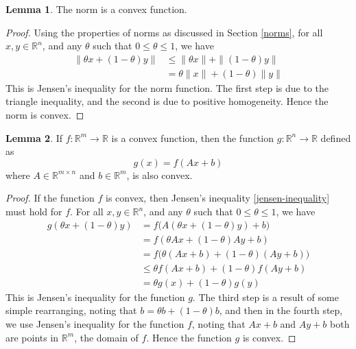 \documentclass[a4paper]{article}
\theoremstyle{definition}
\newtheorem{lemma}{Lemma}[subsection]
\begin{document}
\begin{lemma}
	\label{norm-convex}
	The norm is a convex function.
\end{lemma}
\begin{proof}
	Using the properties of norms as discussed in Section \ref{norms}, for all $x, y \in \mathbb{R}^n$, and any $\theta$ such that $0 \leq \theta \leq 1$, we have
	\begin{align*}
		\| \theta x + (1 - \theta) y \| & \leq \| \theta x \| + \| (1 - \theta) y \| \\
		& = \theta \| x \| + (1 - \theta) \| y \|
	\end{align*}
	This is Jensen's inequality for the norm function.
	The first step is due to the triangle inequality, and the second is due to positive homogeneity.
	Hence the norm is convex.
\end{proof}

\begin{lemma}
	If $f : \mathbb{R}^m \rightarrow \mathbb{R}$ is a convex function, then the function $g : \mathbb{R}^n \rightarrow \mathbb{R}$ defined as
	\begin{equation*}
		g(x) = f(Ax + b)
	\end{equation*}
	where $A \in \mathbb{R}^{m \times n}$ and $b \in \mathbb{R}^m$, is also convex.
\end{lemma}
\begin{proof}
	If the function $f$ is convex, then Jensen's inequality \eqref{jensen-inequality} must hold for $f$.
	For all $x, y \in \mathbb{R}^n$, and any $\theta$ such that $0 \leq \theta \leq 1$, we have
	\begin{align*}
		g(\theta x + (1 - \theta) y) & = f \big( A (\theta x + (1 - \theta) y) + b \big) \\
		& = f ( \theta Ax + (1 - \theta) Ay + b) \\
		& = f \big( \theta (Ax + b) + (1 - \theta) (Ay + b) \big) \\
		& \leq \theta f(Ax + b) + (1 - \theta) f(Ay + b) \\
		& = \theta g(x) + (1 - \theta) g(y)
	\end{align*}
	This is Jensen's inequality for the function $g$.
	The third step is a result of some simple rearranging, noting that $b = \theta b + (1 - \theta) b$, and then in the fourth step, we use Jensen's inequality for the function $f$, noting that $Ax + b$ and $Ay + b$ both are points in $\mathbb{R}^m$, the domain of $f$.
	Hence the function $g$ is convex.
\end{proof}
\end{document}
